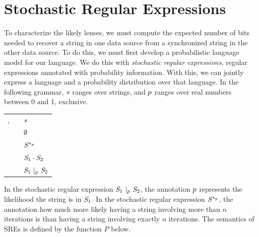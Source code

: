 \documentclass[acmsmall,screen,anonymous]{acmart}
\begin{document}

\section{Stochastic Regular Expressions}
\label{sec:sre}
To characterize the likely lenses, we must compute the expected number of bits
needed to recover a string in one data source from a synchronized string in the
other data source. To do this, we must first develop a probabilistic language
model for our language. We do this with \emph{stochastic regular expressions},
regular expressions annotated with probability information. With this, we can
jointly express a language and a probability distribution over that language. In
the following grammar, $\String$ ranges over strings, and $\Probability$ ranges
over real numbers between 0 and 1, exclusive.

\begin{center}
  \begin{tabular}{rcl}
    \Regex{},\RegexAlt{}
    & \GEq{} & $\String$ \\
    & \GBar{} & $\emptyset$ \\
    & \GBar{} & $\PRegexStar{\Regex}{p}$ \\
    & \GBar{} & $\RegexConcat{\Regex_1}{\Regex_2}$ \\
    & \GBar{} & $\PRegexOr{\Regex_1}{\Regex_2}{p}$
  \end{tabular}
\end{center}

In the stochastic regular expression
$\PRegexOr{\Regex_1}{\Regex_2}{\Probability}$, the annotation $\Probability$
represents the likelihood the string is in $\Regex_1$. In the stochastic regular
expression $\PRegexStar{\Regex}{\Probability}$, the annotation \Probability how
much more likely having a string involving more than $n$ iterations is than
having a string involving exactly $n$ iterations. The semantics of SREs is
defined by the function $P$ below.
\end{document}
